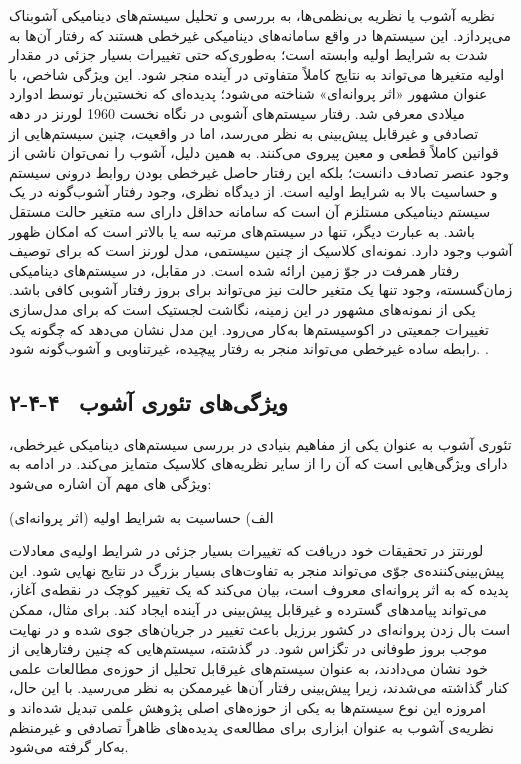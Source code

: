 نظریه آشوب یا نظریه بی‌نظمی‌ها، به بررسی و تحلیل سیستم‌های دینامیکی آشوبناک می‌پردازد. این سیستم‌ها در واقع سامانه‌های دینامیکی غیرخطی هستند که رفتار آن‌ها به شدت به شرایط اولیه وابسته است؛ به‌طوری‌که حتی تغییرات بسیار جزئی در مقدار اولیه متغیرها می‌تواند به نتایج کاملاً متفاوتی در آینده منجر شود. این ویژگی شاخص، با عنوان مشهور «اثر پروانه‌ای» شناخته می‌شود؛ پدیده‌ای که نخستین‌بار توسط ادوارد لورنز در دهه ‎1960‎ میلادی معرفی شد. رفتار سیستم‌های آشوبی در نگاه نخست تصادفی و غیرقابل پیش‌بینی به نظر می‌رسد، اما در واقعیت، چنین سیستم‌هایی از قوانین کاملاً قطعی و معین پیروی می‌کنند. به همین دلیل، آشوب را نمی‌توان ناشی از وجود عنصر تصادف دانست؛ بلکه این رفتار حاصل غیرخطی بودن روابط درونی سیستم و حساسیت بالا به شرایط اولیه است. از دیدگاه نظری، وجود رفتار آشوب‌گونه در یک سیستم دینامیکی مستلزم آن است که سامانه حداقل دارای سه متغیر حالت مستقل باشد. به عبارت دیگر، تنها در سیستم‌های مرتبه سه یا بالاتر است که امکان ظهور آشوب وجود دارد. نمونه‌ای کلاسیک از چنین سیستمی، مدل لورنز است که برای توصیف رفتار همرفت در جوّ زمین ارائه شده است. در مقابل، در سیستم‌های دینامیکی زمان‌گسسته، وجود تنها یک متغیر حالت نیز می‌تواند برای بروز رفتار آشوبی کافی باشد. یکی از نمونه‌های مشهور در این زمینه، نگاشت لجستیک است که برای مدل‌سازی تغییرات جمعیتی در اکوسیستم‌ها به‌کار می‌رود. این مدل نشان می‌دهد که چگونه یک رابطه ساده غیرخطی می‌تواند منجر به رفتار پیچیده، غیرتناوبی و آشوب‌گونه شود. \cite{ref42, ref46}.

\subsection{۲-۴-۴  ویژگی‌های تئوری آشوب}

تئوری آشوب به عنوان یکی از مفاهیم بنیادی در بررسی سیستم‌های دینامیکی غیرخطی، دارای ویژگی‌هایی است که آن را از سایر نظریه‌های کلاسیک متمایز می‌کند. در ادامه به ویژگی های مهم آن اشاره می‌شود:

الف) حساسیت به شرایط اولیه (اثر پروانه‌ای)

لورنتز در تحقیقات خود دریافت که تغییرات بسیار جزئی در شرایط اولیه‌ی معادلات پیش‌بینی‌کننده‌ی جوّی می‌تواند منجر به تفاوت‌های بسیار بزرگ در نتایج نهایی شود. این پدیده که به اثر پروانه‌ای معروف است، بیان می‌کند که یک تغییر کوچک در نقطه‌ی آغاز، می‌تواند پیامدهای گسترده و غیرقابل پیش‌بینی در آینده ایجاد کند. برای مثال، ممکن است بال زدن پروانه‌ای در کشور برزیل باعث تغییر در جریان‌های جوی شده و در نهایت موجب بروز طوفانی در تگزاس شود. در گذشته، سیستم‌هایی که چنین رفتارهایی از خود نشان می‌دادند، به عنوان سیستم‌های غیرقابل تحلیل از حوزه‌ی مطالعات علمی کنار گذاشته می‌شدند، زیرا پیش‌بینی رفتار آن‌ها غیرممکن به نظر می‌رسید. با این حال، امروزه این نوع سیستم‌ها به یکی از حوزه‌های اصلی پژوهش علمی تبدیل شده‌اند و نظریه‌ی آشوب به عنوان ابزاری برای مطالعه‌ی پدیده‌های ظاهراً تصادفی و غیرمنظم به‌کار گرفته می‌شود\cite{ref41}.

